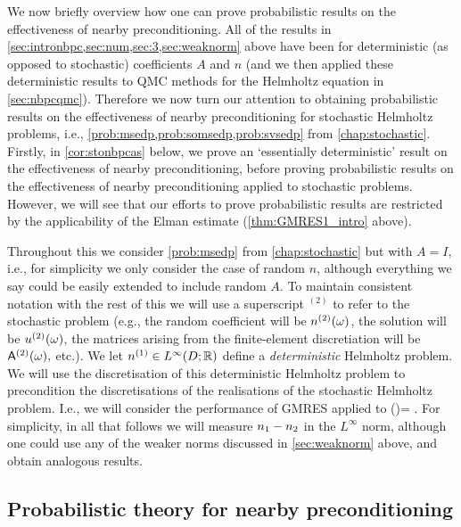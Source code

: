We now briefly overview how one can prove probabilistic results on the effectiveness of nearby preconditioning. All of the results in \cref{sec:intronbpc,sec:num,sec:3,sec:weaknorm} above have been for deterministic (as opposed to stochastic) coefficients $A$ and $n$ (and we then applied these deterministic results to QMC methods for the Helmholtz equation in \cref{sec:nbpcqmc}). Therefore we now turn our attention to obtaining probabilistic results on the effectiveness of nearby preconditioning for stochastic Helmholtz problems, i.e., \cref{prob:msedp,prob:somsedp,prob:svsedp} from \cref{chap:stochastic}. Firstly, in \cref{cor:stonbpcas} below, we prove an `essentially deterministic' result on the effectiveness of nearby preconditioning, before proving probabilistic results on the effectiveness of nearby preconditioning applied to stochastic problems. However, we will see that our efforts to prove probabilistic results are restricted by the applicability of the Elman estimate (\cref{thm:GMRES1_intro} above).

Throughout this  we consider \cref{prob:msedp} from \cref{chap:stochastic} but with $A=I$, i.e., for simplicity we only consider the case of random $n$, although everything we say could be easily extended to include random $A$. To maintain consistent notation with the rest of this  we will use a superscript ${}^{(2)}$ to refer to the stochastic problem (e.g., the random coefficient will be ${n}^{(2)}(\omega)$, the solution will be ${u}^{(2)}(\omega)$, the matrices arising from the finite-element discretiation will be $\mathsf{A}^{(2)}(\omega),$ etc.). We let $\nso \in \LiDRR$ define a \emph{deterministic} Helmholtz problem. We will use the discretisation of this deterministic Helmholtz problem to precondition the discretisations of the realisations of the stochastic Helmholtz problem. I.e., we will consider the performance of GMRES applied to
\beq\label{eq:stopc}
\AmatoI\Amatt(\omega)\uvec = \AmatoI \fvec.
\eeq
For simplicity, in all that follows we will measure $n_{1}-n_{2}$ in the $L^{\infty}$ norm, although one could use any of the weaker norms discussed in \cref{sec:weaknorm} above, and obtain analogous results.

\subsection{Probabilistic theory for nearby preconditioning}
\label{def:numGMRESitsconv}

